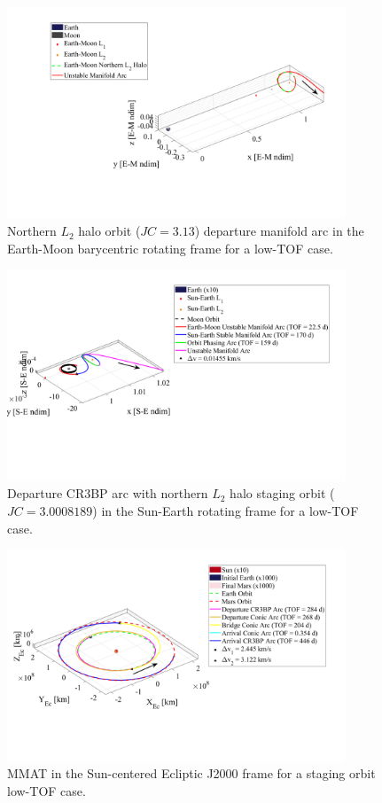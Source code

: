 \begin{figure}[H]
    \centering
    \includegraphics[width=0.9\textwidth]{figures/StagedMinTOFEM.pdf}
    \caption{Northern $L_{2}$ halo orbit ($JC=3.13$) departure manifold arc in the Earth-Moon barycentric rotating frame for a low-TOF case.}
    \label{fig:stagedMinTOFEM}
\end{figure}

\begin{figure}[H]
    \centering
    \includegraphics[width=0.9\textwidth]{figures/StagedMinTOFSE.pdf}
    \caption{Departure CR3BP arc with northern $L_{2}$ halo staging orbit ($JC=3.0008189$) in the Sun-Earth rotating frame for a low-TOF case.}
    \label{fig:stagedMinTOFSE}
\end{figure}

\begin{figure}[H]
    \centering
    \includegraphics[width=0.9\textwidth]{figures/StagedMinTOFMMAT.pdf}
    \caption{MMAT in the Sun-centered Ecliptic J2000 frame for a staging orbit low-TOF case.}
    \label{fig:stagedMinTOFMMAT}
\end{figure}


